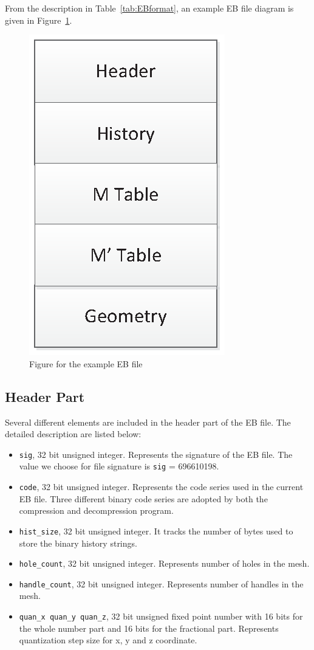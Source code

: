 \documentclass[onecolumn, 12pt]{article}
\begin{document}
From the description in Table~\ref{tab:EBformat}, an example EB file diagram is given in Figure~\ref{fig:ebfile}.
\begin{figure}[h]
\centering
\includegraphics[scale=0.6, clip, keepaspectratio]{fig_ebfile.eps}
\caption{Figure for the example EB file}\label{fig:ebfile}
\end{figure}


\subsection{Header Part}
Several different elements are included in the header part of the EB file. The detailed description are listed below:

\begin{itemize}\itemsep=2pt
\item \lstinline !sig!, 32 bit unsigned integer. Represents the signature of the EB file. The value we choose for file signature is \lstinline!sig! = 696610198.
\item \lstinline !code!, 32 bit unsigned integer. Represents the code series used in the current EB file. Three different binary code series are adopted by both the compression and decompression program.
\item \lstinline !hist_size!, 32 bit unsigned integer. It tracks the number of bytes used to store the binary history strings.
\item \lstinline !hole_count!, 32 bit unsigned integer. Represents number of holes in the mesh.
\item \lstinline !handle_count!, 32 bit unsigned integer. Represents number of handles in the mesh.
\item \lstinline !quan_x quan_y quan_z!, 32 bit unsigned fixed point number with 16 bits for the whole number part and 16 bits for the fractional part. Represents quantization step size for x, y and z coordinate.
\end{itemize}
\end{document}

